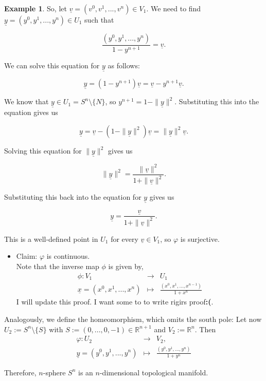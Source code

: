 \documentclass[
]{book}
\providecommand{\tightlist}{%
  \setlength{\itemsep}{0pt}\setlength{\parskip}{0pt}}
\theoremstyle{definition}
\theoremstyle{definition}
\newtheorem{example}{Example}[chapter]
\theoremstyle{definition}
\theoremstyle{definition}
\theoremstyle{remark}
\begin{document}
\begin{example}
So, let \(\underline{v} = (v^0, v^1, ..., v^n) \in V_1\). We need to find \(\underline{y} = (y^0, y^1, ..., y^n) \in U_1\) such that

\[\frac{(y^0, y^1, ..., y^n)}{1-y^{n+1}} = \underline{v}.\]

We can solve this equation for \(\underline{y}\) as follows:

\[\underline{y} = (1-y^{n+1})\underline{v} = \underline{v} - y^{n+1}\underline{v}.\]

We know that \(\underline{y} \in U_1 = S^n \setminus \{N\}\), so \(y^{n+1} = 1 - \|\underline{y}\|^2\). Substituting this into the equation gives us

\[\underline{y} = \underline{v} - (1 - \|\underline{y}\|^2)\underline{v} = \|\underline{y}\|^2\underline{v}.\]

Solving this equation for \(\|\underline{y}\|^2\) gives us

\[\|\underline{y}\|^2 = \frac{\|\underline{v}\|^2}{1 + \|\underline{v}\|^2}.\]

Substituting this back into the equation for \(\underline{y}\) gives us

\[\underline{y} = \frac{\underline{v}}{1 + \|\underline{v}\|^2}.\]

This is a well-defined point in \(U_1\) for every \(\underline{v} \in V_1\), so \(\varphi\) is surjective.

\begin{itemize}
\tightlist
\item
  Claim: \(\varphi\) is continuous.\\
  Note that the inverse map \(\phi\) is given by,
  \begin{eqnarray}
  \phi : V_1 &\rightarrow & U_1\\
  \underline{x}= (x^0, x^1, ... , x^n) &\mapsto & \frac{(x^0,x^1,...,x^{n-1})}{1 + x^n} 
  \end{eqnarray}
  {I will update this proof. I want some to to write rigirs proof\textbf{:(}}.
\end{itemize}

Analogously, we define the homeomorphism, which omits the south pole:
Let now \(U_2 := S^n \setminus \{S\}\) with \(S := ( 0,... , 0, -1) \in \mathbb{R}^{n+1}\) and \(V_2 := \mathbb{R}^n\).
Then
\begin{eqnarray}
\varphi : U_2 &\rightarrow & V_2,\\
\underline{y}= (y^0, y^1, ... , y^n) &\mapsto & \frac{(y^0,y^1,...,y^n)}{1 + y^n} 
\end{eqnarray}

Therefore, \(n\)-sphere \(S^n\) is an \(n\)-dimensional topological manifold.
\end{example}
\end{document}
